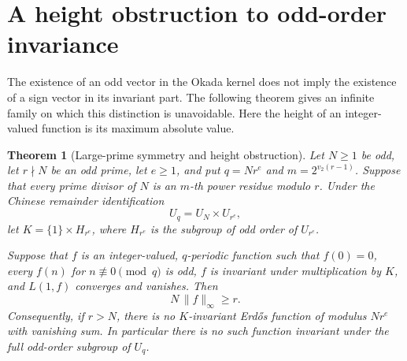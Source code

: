 \documentclass[11pt]{amsart}
\newtheorem{theorem}{Theorem}[section]
\theoremstyle{definition}
\theoremstyle{remark}
\numberwithin{equation}{section}
\begin{document}
\section{A height obstruction to odd-order invariance}

The existence of an odd vector in the Okada kernel does not imply the
existence of a sign vector in its invariant part.  The following theorem
gives an infinite family on which this distinction is unavoidable.
Here the height of an integer-valued function is its maximum absolute value.

\begin{theorem}[Large-prime symmetry and height obstruction]
\label{thm:large-prime-symmetry}
Let $N\geq1$ be odd, let $r\nmid N$ be an odd prime, let $e\geq1$, and
put $q=Nr^e$ and $m=2^{v_2(r-1)}$.  Suppose that every prime divisor of
$N$ is an $m$-th power residue modulo $r$.  Under the Chinese remainder
identification
\[
  U_q=U_N\times U_{r^e},
\]
let $K=\{1\}\times H_{r^e}$, where $H_{r^e}$ is the subgroup of odd order
of $U_{r^e}$.

Suppose that $f$ is an integer-valued, $q$-periodic function such that
$f(0)=0$, every $f(n)$ for $n\not\equiv0\pmod q$ is odd, $f$ is invariant
under multiplication by $K$, and $L(1,f)$ converges and vanishes.
Then
\[
  N\,\lVert f\rVert_\infty\geq r.
\]
Consequently, if $r>N$, there is no $K$-invariant Erd\H{o}s function of
modulus $Nr^e$ with vanishing sum.  In particular there is no such
function invariant under the full odd-order subgroup of $U_q$.
\end{theorem}
\end{document}
